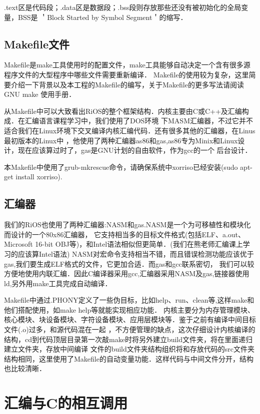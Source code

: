 .text区是代码段；.data区是数据段；.bss段则存放那些还没有被初始化的全局变量，BSS是
＇Block Started by Symbol Segment＇的缩写．

\subsection{Makefile文件}
Makefile是make工具使用时的配置文件，make工具能够自动决定一个含有很多源程序文件的大型程序中哪些文件需要重新编译．
Makefile的使用较为复杂，这里简要介绍一下背景以及本工程的Makefile的编写，关于Makefile的更多写法请阅读GNU make
使用手册．

从Makefile中可以大致看出RiOS的整个框架结构．内核主要由C或C++及汇编构成．在汇编语言课程学习中，我们使用了DOS环境
下MASM汇编器，不过它并不适合我们在Linux环境下交叉编译内核汇编代码．还有很多其他的汇编器，在Linus最初版本的Linux中
，他使用了两种汇编器as86和gas,as86专为Minix和Linux设计，现在应该算过时了，gas是GNU计划的自由软件，作为gcc的一个
后台设计．

本Makefile中使用了grub-mkrescue命令，请确保系统中xorriso已经安装(sudo apt-get install xorriso).

\subsection{汇编器}
我们的RiOS也使用了两种汇编器:NASM和gas.NASM是一个为可移植性和模块化而设计的一个80x86汇编器，
它支持相当多的目标文件格式(包括ELF、a.out、Microsoft 16-bit OBJ等)，和Intel语法相似但更简单．(我们在熊老师汇编课上学习的应该算Intel语法)
NASM对宏命令支持相当不错，而且错误检测功能应该优于gas,我们要生成ELF格式的文件，它更加合适．而gas和gcc联系密切，
我们可以较方便地使用内联汇编．因此C编译器采用gcc,汇编器采用NASM及gas,链接器使用ld,另外用make工具完成自动编译．

Makefile中通过.PHONY定义了一些伪目标，比如help、run、clean等,这样make和他们搭配使用，如make help等就能实现相应功能．
内核主要分为内存管理模块、核心模块、块设备模块、字符设备模块、应用层模块等．鉴于之前有编译中间目标文件(.o)过多，和源代码混在一起
，不方便管理的缺点，这次仔细设计内核编译的结构，cd到代码顶层目录第一次敲make时将另外建立build文件夹，将在里面递归建立文件夹，存放中间编译
文件的build文件夹结构组织将和存放代码的src文件夹结构相同，这里使用了Makefile的自动变量功能．这样代码与中间文件分开，结构也比较清晰．

\section{汇编与C的相互调用}
